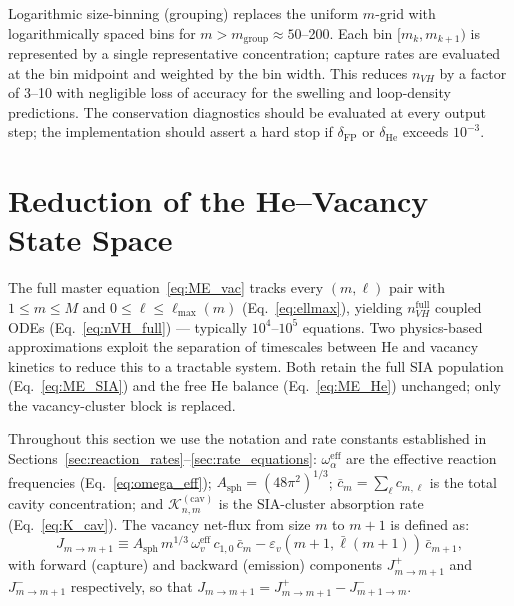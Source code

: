 \documentclass[pdflatex,sn-basic]{sn-jnl} %
\begin{document}
Logarithmic size-binning (grouping) replaces the uniform $m$-grid with
logarithmically spaced bins for $m > m_{\mathrm{group}} \approx 50$--200.
Each bin $[m_k, m_{k+1})$ is represented by a single representative
concentration; capture rates are evaluated at the bin midpoint and
weighted by the bin width. This reduces $n_{VH}$ by a factor of 3--10
with negligible loss of accuracy for the swelling and loop-density
predictions. The conservation diagnostics should be evaluated at every
output step; the implementation should assert a hard stop if
$\delta_{\mathrm{FP}}$ or $\delta_{\mathrm{He}}$ exceeds $10^{-3}$.

\section{Reduction of the He--Vacancy State Space}
\label{sec:HeV_CD}

The full master equation~\eqref{eq:ME_vac} tracks every $(m,\ell)$
pair with $1 \leq m \leq M$ and $0 \leq \ell \leq \ell_{\max}(m)$
(Eq.~\ref{eq:ellmax}), yielding $n_{VH}^{\mathrm{full}}$ coupled ODEs
(Eq.~\ref{eq:nVH_full}) --- typically $10^4$--$10^5$ equations. Two
physics-based approximations exploit the separation of timescales
between He and vacancy kinetics to reduce this to a tractable system.
Both retain the full SIA population (Eq.~\ref{eq:ME_SIA}) and the free
He balance (Eq.~\ref{eq:ME_He}) unchanged; only the vacancy-cluster
block is replaced.

Throughout this section we use the notation and rate constants
established in Sections~\ref{sec:reaction_rates}--\ref{sec:rate_equations}:
$\omega_\alpha^{\mathrm{eff}}$ are the effective reaction frequencies
(Eq.~\ref{eq:omega_eff}); $A_{\mathrm{sph}} = (48\pi^2)^{1/3}$;
$\bar{c}_m = \sum_\ell c_{m,\ell}$ is the total cavity concentration;
and $\mathcal{K}_{n,m}^{(\mathrm{cav})}$ is the SIA-cluster absorption
rate (Eq.~\ref{eq:K_cav}). The vacancy net-flux from size $m$ to $m+1$
is defined as:
\begin{equation}\label{eq:Jv}
    J_{m \to m+1}
    \equiv A_{\mathrm{sph}}\,m^{1/3}\,\omega_v^{\mathrm{eff}}\,
           c_{1,0}\,\bar{c}_m
         - \varepsilon_v(m{+}1,\bar{\ell}(m{+}1))\,\bar{c}_{m+1},
\end{equation}
with forward (capture) and backward (emission) components
$J_{m\to m+1}^{+}$ and $J_{m\to m+1}^{-}$ respectively, so that
$J_{m\to m+1} = J_{m\to m+1}^{+} - J_{m+1\to m}^{-}$.
\end{document}
